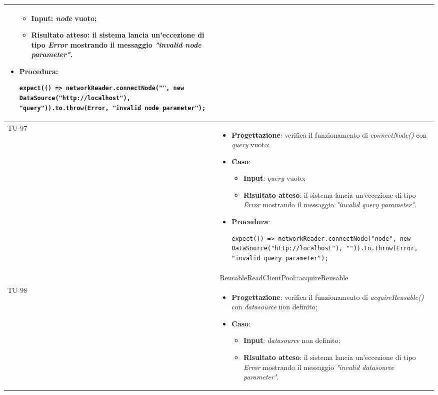 \begin{longtable}{|C{1.5cm}|C{14.5cm}|}
\begin{itemize}
	\begin{itemize}
		\item \textbf{Input}: \emph{node} vuoto;
		\item \textbf{Risultato atteso}: il sistema lancia un'eccezione di tipo \emph{Error} mostrando il messaggio \emph{"invalid node parameter"}.
	\end{itemize}
	\item \textbf{Procedura}:
	\begin{lstlisting}
expect(() => networkReader.connectNode("", new DataSource("http://localhost"), "query")).to.throw(Error, "invalid node parameter");
	\end{lstlisting}
\end{itemize}\\
\hline
{TU-97} &
\begin{itemize}
	\item \textbf{Progettazione}: verifica il funzionamento di \emph{connectNode()} con \emph{query} vuoto;
	\item \textbf{Caso}: 
	\begin{itemize}
		\item \textbf{Input}: \emph{query} vuoto;
		\item \textbf{Risultato atteso}: il sistema lancia un'eccezione di tipo \emph{Error} mostrando il messaggio \emph{"invalid query parameter"}.
	\end{itemize}
	\item \textbf{Procedura}:
	\begin{lstlisting}
expect(() => networkReader.connectNode("node", new DataSource("http://localhost"), "")).to.throw(Error, "invalid query parameter");
	\end{lstlisting}
\end{itemize}\\
\hline
{} & ReusableReadClientPool::acquireReusable
\\ \hline
{TU-98} &
\begin{itemize}
	\item \textbf{Progettazione}: verifica il funzionamento di \emph{acquireReusable()} con \emph{datasource} non definito;
	\item \textbf{Caso}: 
	\begin{itemize}
		\item \textbf{Input}: \emph{datasource} non definito;
		\item \textbf{Risultato atteso}: il sistema lancia un'eccezione di tipo \emph{Error} mostrando il messaggio \emph{"invalid datasource parameter"}.

\end{itemize}
\end{itemize}
\end{longtable}
